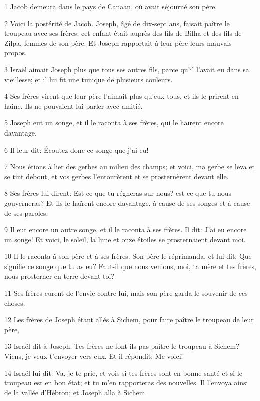 \par 1 Jacob demeura dans le pays de Canaan, où avait séjourné son père.
\par 2 Voici la postérité de Jacob. Joseph, âgé de dix-sept ans, faisait paître le troupeau avec ses frères; cet enfant était auprès des fils de Bilha et des fils de Zilpa, femmes de son père. Et Joseph rapportait à leur père leurs mauvais propos.
\par 3 Israël aimait Joseph plus que tous ses autres fils, parce qu'il l'avait eu dans sa vieillesse; et il lui fit une tunique de plusieurs couleurs.
\par 4 Ses frères virent que leur père l'aimait plus qu'eux tous, et ils le prirent en haine. Ils ne pouvaient lui parler avec amitié.
\par 5 Joseph eut un songe, et il le raconta à ses frères, qui le haïrent encore davantage.
\par 6 Il leur dit: Écoutez donc ce songe que j'ai eu!
\par 7 Nous étions à lier des gerbes au milieu des champs; et voici, ma gerbe se leva et se tint debout, et vos gerbes l'entourèrent et se prosternèrent devant elle.
\par 8 Ses frères lui dirent: Est-ce que tu régneras sur nous? est-ce que tu nous gouverneras? Et ils le haïrent encore davantage, à cause de ses songes et à cause de ses paroles.
\par 9 Il eut encore un autre songe, et il le raconta à ses frères. Il dit: J'ai eu encore un songe! Et voici, le soleil, la lune et onze étoiles se prosternaient devant moi.
\par 10 Il le raconta à son père et à ses frères. Son père le réprimanda, et lui dit: Que signifie ce songe que tu as eu? Faut-il que nous venions, moi, ta mère et tes frères, nous prosterner en terre devant toi?
\par 11 Ses frères eurent de l'envie contre lui, mais son père garda le souvenir de ces choses.
\par 12 Les frères de Joseph étant allés à Sichem, pour faire paître le troupeau de leur père,
\par 13 Israël dit à Joseph: Tes frères ne font-ils pas paître le troupeau à Sichem? Viens, je veux t'envoyer vers eux. Et il répondit: Me voici!
\par 14 Israël lui dit: Va, je te prie, et vois si tes frères sont en bonne santé et si le troupeau est en bon état; et tu m'en rapporteras des nouvelles. Il l'envoya ainsi de la vallée d'Hébron; et Joseph alla à Sichem.

